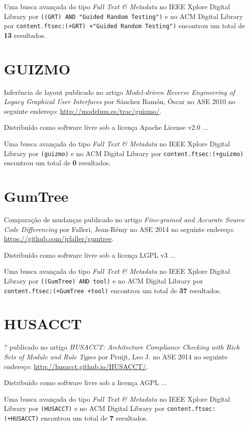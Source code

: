 Uma busca avançada do tipo {\it Full Text \& Metadata} no IEEE Xplore Digital Library por
\texttt{((GRT) AND "Guided Random Testing")}
e no ACM Digital Library por
\texttt{content.ftsec:(+GRT) +"Guided Random Testing")}
encontrou um total de
{\bf 13}
resultados.

\section{GUIZMO}

Inferência de layout
publicado no artigo
{\it Model-driven Reverse Engineering of Legacy Graphical User Interfaces}
por
S\'{a}nchez Ram\'{o}n, \'{O}scar
no
ASE
2010
no seguinte endereço:
\url{http://modelum.es/trac/guizmo/}.

Distribuído como software livre
sob a licença Apache License v2.0 ...


Uma busca avançada do tipo {\it Full Text \& Metadata} no IEEE Xplore Digital Library por
\texttt{(guizmo)}
e no ACM Digital Library por
\texttt{content.ftsec:(+guizmo)}
encontrou um total de
{\bf 0}
resultados.

\section{GumTree}

Comparação de mudanças
publicado no artigo
{\it Fine-grained and Accurate Source Code Differencing}
por
Falleri, Jean-R{\'e}my
no
ASE
2014
no seguinte endereço:
\url{https://github.com/jrfaller/gumtree}.

Distribuído como software livre
sob a licença LGPL v3 ...


Uma busca avançada do tipo {\it Full Text \& Metadata} no IEEE Xplore Digital Library por
\texttt{((GumTree) AND tool)}
e no ACM Digital Library por
\texttt{content.ftsec:(+GumTree +tool)}
encontrou um total de
{\bf 37}
resultados.

\section{HUSACCT}

?
publicado no artigo
{\it HUSACCT: Architecture Compliance Checking with Rich Sets of Module and Rule Types}
por
Pruijt, Leo J.
no
ASE
2014
no seguinte endereço:
\url{http://husacct.github.io/HUSACCT/}.

Distribuído como software livre
sob a licença AGPL ...


Uma busca avançada do tipo {\it Full Text \& Metadata} no IEEE Xplore Digital Library por
\texttt{(HUSACCT)}
e no ACM Digital Library por
\texttt{content.ftsec:(+HUSACCT)}
encontrou um total de
{\bf 7}
resultados.


